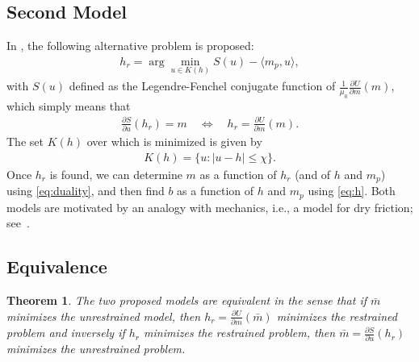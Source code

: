 \documentclass[12pt]{article}
\newtheorem{theorem}{Theorem}
\begin{document}
\subsection{Second Model}
%
In \cite{Prigozhin}, the following alternative problem is proposed:
\begin{align} \label{eq:prigozhin}
    h_r = \arg\min_{u \in K(h)} S(u) - \langle m_p, u\rangle,
\end{align}
with $S(u)$ defined as the Legendre-Fenchel conjugate function of $\frac{1}{\mu_0} \frac{\partial U}{\partial m}(m)$, which simply means that
\begin{align} \label{eq:duality}
    \frac{\partial S}{\partial u}(h_r) = m \quad \Leftrightarrow \quad h_r = \frac{\partial U}{\partial m}(m).
\end{align}
The set $K(h)$ over which is minimized is given by 
\begin{align} \label{eq:Kh}
    K(h) = \{ u : |u-h| \le \chi\}.
\end{align}
%
Once $h_r$ is found, we can determine $m$ as a function of $h_r$ (and of $h$ and $m_p$) using \eqref{eq:duality}, and then find $b$ as a function of $h$
and $m_p$ using \eqref{eq:h}.
%
Both models are motivated by an analogy with mechanics, i.e., a model for dry friction; see~\cite{Moreau}. 

\subsection{Equivalence}

\begin{theorem}
The two proposed models are equivalent in the sense that if $\bar m$ minimizes the unrestrained model, then $h_r = \frac{\partial U}{\partial m}(\bar m)$ minimizes the restrained problem and inversely if $h_r$ minimizes the restrained problem, then $\bar m = \frac{\partial S}{\partial u}(h_r)$ minimizes the unrestrained problem.
\end{theorem}
\end{document}

